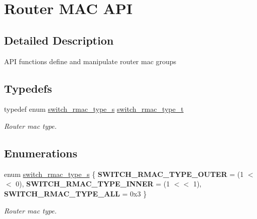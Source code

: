 \hypertarget{group__RMAC}{\section{Router M\+A\+C A\+P\+I}
\label{group__RMAC}
}


\subsection{Detailed Description}
A\+P\+I functions define and manipulate router mac groups \subsection*{Typedefs}
\begin{DoxyCompactItemize}
\item 
typedef enum \hyperlink{group__RMAC_ga94f4ae9be27dff0c75f12842524418a3}{switch\+\_\+rmac\+\_\+type\+\_\+s} \hyperlink{group__RMAC_gaa7deac8b108c4f020a3ef4ad546ade81}{switch\+\_\+rmac\+\_\+type\+\_\+t}
\begin{DoxyCompactList}\small\item\em Router mac type. \end{DoxyCompactList}\end{DoxyCompactItemize}
\subsection*{Enumerations}
\begin{DoxyCompactItemize}
\item 
enum \hyperlink{group__RMAC_ga94f4ae9be27dff0c75f12842524418a3}{switch\+\_\+rmac\+\_\+type\+\_\+s} \{ {\bfseries S\+W\+I\+T\+C\+H\+\_\+\+R\+M\+A\+C\+\_\+\+T\+Y\+P\+E\+\_\+\+O\+U\+T\+E\+R} = (1 $<$$<$ 0), 
{\bfseries S\+W\+I\+T\+C\+H\+\_\+\+R\+M\+A\+C\+\_\+\+T\+Y\+P\+E\+\_\+\+I\+N\+N\+E\+R} = (1 $<$$<$ 1), 
{\bfseries S\+W\+I\+T\+C\+H\+\_\+\+R\+M\+A\+C\+\_\+\+T\+Y\+P\+E\+\_\+\+A\+L\+L} = 0x3
 \}
\begin{DoxyCompactList}\small\item\em Router mac type. \end{DoxyCompactList}\end{DoxyCompactItemize}
